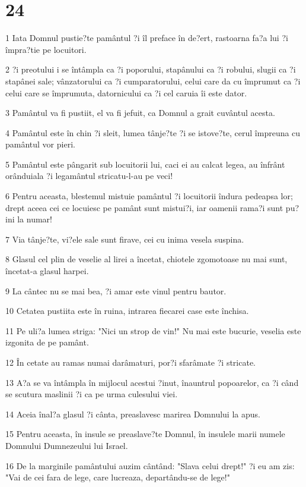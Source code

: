 \chapter{24}

\par 1 Iata Domnul pustie?te pamântul ?i îl preface în de?ert, rastoarna fa?a lui ?i împra?tie pe locuitori.
\par 2 ?i preotului i se întâmpla ca ?i poporului, stapânului ca ?i robului, slugii ca ?i stapânei sale; vânzatorului ca ?i cumparatorului, celui care da cu împrumut ca ?i celui care se împrumuta, datornicului ca ?i cel caruia îi este dator.
\par 3 Pamântul va fi pustiit, el va fi jefuit, ca Domnul a grait cuvântul acesta.
\par 4 Pamântul este în chin ?i sleit, lumea tânje?te ?i se istove?te, cerul împreuna cu pamântul vor pieri.
\par 5 Pamântul este pângarit sub locuitorii lui, caci ei au calcat legea, au înfrânt orânduiala ?i legamântul stricatu-l-au pe veci!
\par 6 Pentru aceasta, blestemul mistuie pamântul ?i locuitorii îndura pedeapsa lor; drept aceea cei ce locuiesc pe pamânt sunt mistui?i, iar oamenii rama?i sunt pu?ini la numar!
\par 7 Via tânje?te, vi?ele sale sunt firave, cei cu inima vesela suspina.
\par 8 Glasul cel plin de veselie al lirei a încetat, chiotele zgomotoase nu mai sunt, încetat-a glasul harpei.
\par 9 La cântec nu se mai bea, ?i amar este vinul pentru bautor.
\par 10 Cetatea pustiita este în ruina, intrarea fiecarei case este închisa.
\par 11 Pe uli?a lumea striga: "Nici un strop de vin!" Nu mai este bucurie, veselia este izgonita de pe pamânt.
\par 12 În cetate au ramas numai darâmaturi, por?i sfarâmate ?i stricate.
\par 13 A?a se va întâmpla în mijlocul acestui ?inut, înauntrul popoarelor, ca ?i când se scutura maslinii ?i ca pe urma culesului viei.
\par 14 Aceia înal?a glasul ?i cânta, preaslavesc marirea Domnului la apus.
\par 15 Pentru aceasta, în insule se preaslave?te Domnul, în insulele marii numele Domnului Dumnezeului lui Israel.
\par 16 De la marginile pamântului auzim cântând: "Slava celui drept!" ?i eu am zis: "Vai de cei fara de lege, care lucreaza, departându-se de lege!"
